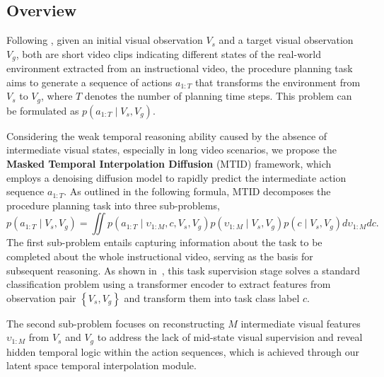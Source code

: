 \subsection{Overview}
\label{method1}

Following \citet{chang2020procedure}, given an initial visual observation $V_s$ and a target visual observation $V_g$, both are short video clips indicating different states of the real-world environment extracted from an instructional video, the procedure planning task aims to generate a sequence of actions $a_{1:T}$ that transforms the environment from $V_s$ to $V_g$, where $T$ denotes the number of planning time steps. This problem can be formulated as $p(a_{1:T} \mid V_s, V_g)$. 

Considering the weak temporal reasoning ability caused by the absence of intermediate visual states, especially in long video scenarios, we propose the \textbf{Masked Temporal Interpolation Diffusion} (MTID) framework, which employs a denoising diffusion model to rapidly predict the intermediate action sequence $a_{1:T}$. As outlined in the following formula, MTID decomposes the procedure planning task into three sub-problems, 
\begin{equation} 
    p(a_{1:T} \mid V_{s}, V_{g}) = \iint p(a_{1:T} \mid \upsilon_{1:M}, c, V_{s}, V_{g}) p(\upsilon_{1:M} \mid V_{s}, V_{g}) p(c \mid V_{s}, V_{g}) d\upsilon_{1:M} dc .
    \label{eq:1}
\end{equation}
The first sub-problem entails capturing information about the task to be completed about the whole instructional video, serving as the basis for subsequent reasoning. 
As shown in~, this task supervision stage solves a standard classification problem using a transformer encoder to extract features from observation pair $\left\{ {V_s, V_g} \right\}$ and transform them into task class label $c$.

The second sub-problem focuses on reconstructing $M$ intermediate visual features $\upsilon_{1:M}$ from $V_s$ and $V_g$ to address the lack of mid-state visual supervision and reveal hidden temporal logic within the action sequences, which is achieved through our latent space temporal interpolation module. 

